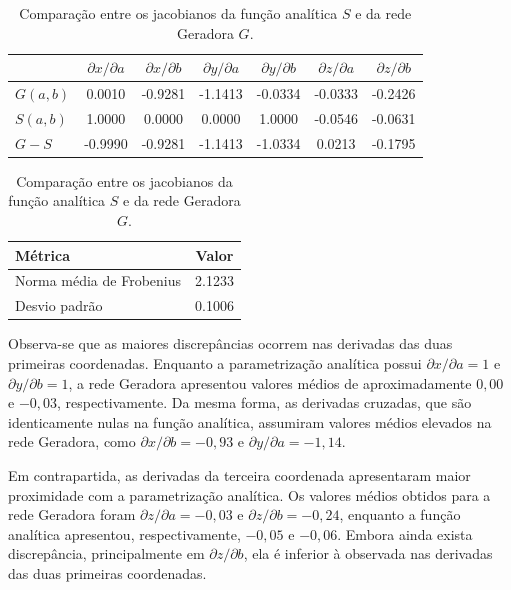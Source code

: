 \begin{table}[H]
\centering
\caption{Comparação entre os jacobianos da função analítica $S$ e da rede Geradora $G$.}
\label{tab:res_grad1}

\begin{tabular}{lcccccc}
\toprule
 & $\partial x/\partial a$ & $\partial x/\partial b$ & $\partial y/\partial a$ & $\partial y/\partial b$ & $\partial z/\partial a$ & $\partial z/\partial b$ \\
\midrule
$G(a,b)$ & 0.0010 & -0.9281 & -1.1413 & -0.0334 & -0.0333 & -0.2426 \\
$S(a,b)$ & 1.0000 & 0.0000 & 0.0000 & 1.0000 & -0.0546 & -0.0631 \\
$G-S$    & -0.9990 & -0.9281 & -1.1413 & -1.0334 & 0.0213 & -0.1795 \\
\bottomrule
\end{tabular}

\vspace{0.3cm}

\begin{tabular}{lc}
\toprule
Métrica & Valor \\
\midrule
Norma média de Frobenius & 2.1233 \\
Desvio padrão & 0.1006 \\
\bottomrule
\end{tabular}

\end{table}

Observa-se que as maiores discrepâncias ocorrem nas derivadas das duas primeiras coordenadas. Enquanto a parametrização analítica possui $\partial x/\partial a = 1$ e $\partial y/\partial b = 1$, a rede Geradora apresentou valores médios de aproximadamente $0,00$ e $-0,03$, respectivamente. Da mesma forma, as derivadas cruzadas, que são identicamente nulas na função analítica, assumiram valores médios elevados na rede Geradora, como $\partial x/\partial b=-0,93$ e $\partial y/\partial a=-1,14$.

Em contrapartida, as derivadas da terceira coordenada apresentaram maior proximidade com a parametrização analítica. Os valores médios obtidos para a rede Geradora foram $\partial z/\partial a=-0,03$ e $\partial z/\partial b=-0,24$, enquanto a função analítica apresentou, respectivamente, $-0,05$ e $-0,06$. Embora ainda exista discrepância, principalmente em $\partial z/\partial b$, ela é inferior à observada nas derivadas das duas primeiras coordenadas.

